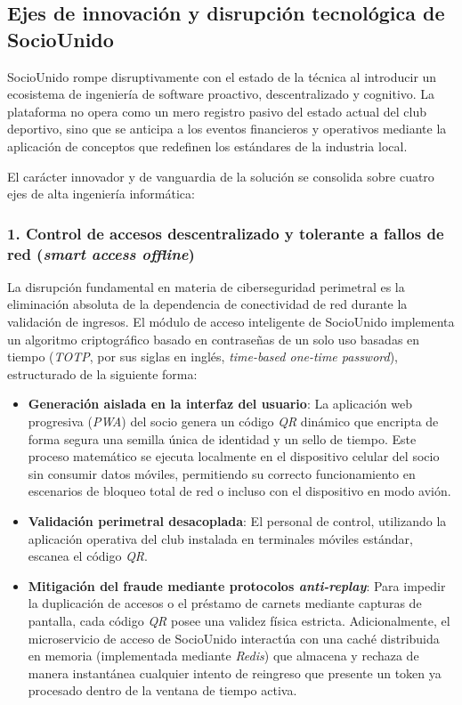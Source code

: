 \subsection{Ejes de innovación y disrupción tecnológica de SocioUnido}

SocioUnido rompe disruptivamente con el estado de la técnica al introducir un ecosistema de ingeniería de software proactivo, descentralizado y cognitivo. La plataforma no opera como un mero registro pasivo del estado actual del club deportivo, sino que se anticipa a los eventos financieros y operativos mediante la aplicación de conceptos que redefinen los estándares de la industria local. 

El carácter innovador y de vanguardia de la solución se consolida sobre cuatro ejes de alta ingeniería informática:

\subsubsection{1. Control de accesos descentralizado y tolerante a fallos de red (\textit{smart access offline})}
La disrupción fundamental en materia de ciberseguridad perimetral es la eliminación absoluta de la dependencia de conectividad de red durante la validación de ingresos. El módulo de acceso inteligente de SocioUnido implementa un algoritmo criptográfico basado en contraseñas de un solo uso basadas en tiempo (\textit{TOTP}, por sus siglas en inglés, \textit{time-based one-time password}), estructurado de la siguiente forma:

\begin{itemize}
    \item \textbf{Generación aislada en la interfaz del usuario}: La aplicación web progresiva (\textit{PWA}) del socio genera un código \textit{QR} dinámico que encripta de forma segura una semilla única de identidad y un sello de tiempo. Este proceso matemático se ejecuta localmente en el dispositivo celular del socio sin consumir datos móviles, permitiendo su correcto funcionamiento en escenarios de bloqueo total de red o incluso con el dispositivo en modo avión.
    \item \textbf{Validación perimetral desacoplada}: El personal de control, utilizando la aplicación operativa del club instalada en terminales móviles estándar, escanea el código \textit{QR}. 
    \item \textbf{Mitigación del fraude mediante protocolos \textit{anti-replay}}: Para impedir la duplicación de accesos o el préstamo de carnets mediante capturas de pantalla, cada código \textit{QR} posee una validez física estricta. Adicionalmente, el microservicio de acceso de SocioUnido interactúa con una caché distribuida en memoria (implementada mediante \textit{Redis}) que almacena y rechaza de manera instantánea cualquier intento de reingreso que presente un token ya procesado dentro de la ventana de tiempo activa.
\end{itemize}

